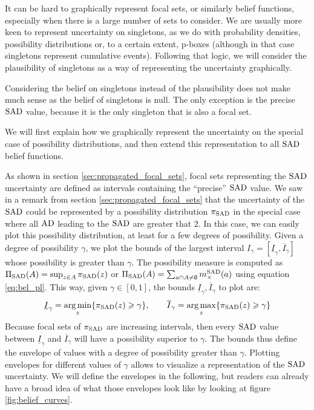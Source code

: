 It can be hard to graphically represent focal sets, or similarly belief functions, especially when there is a large number of sets to consider. We are usually more keen to represent uncertainty on singletons, as we do with probability densities, possibility distributions or, to a certain extent, p-boxes (although in that case singletons represent cumulative events). Following that logic, we will consider the plausibility of singletons as a way of representing the uncertainty graphically.
\begin{remark}
    Considering the belief on singletons instead of the plausibility does not make much sense as the belief of singletons is null. The only exception is the precise ${\mathrm{SAD}}$ value, because it is the only singleton that is also a focal set.
\end{remark}
We will first explain how we  graphically represent the uncertainty on the special case of possibility distributions, and then extend this representation to all ${\mathrm{SAD}}$ belief functions. 

As shown in section \ref{sec:propagated_focal_sets}, focal sets representing the ${\mathrm{SAD}}$ uncertainty are defined as intervals containing the ``precise'' ${\mathrm{SAD}}$ value. We saw in a remark from section \ref{sec:propagated_focal_sets} that the uncertainty of the ${\mathrm{SAD}}$ could be represented by a possibility distribution $\pi_{\mathrm{SAD}}$ in the special case where all ${\mathrm{AD}}$ leading to the ${\mathrm{SAD}}$ are greater that $2$. In this case, we can easily plot this possibility distribution, at least for a few degrees of possibility. Given a degree of possibility $\gamma$, we plot the bounds of the largest interval $I_\gamma=[\underline{I}_\gamma, \overline{I}_\gamma]$ whose possibility is greater than $\gamma$. The possibility measure is computed as $\Pi_{\mathrm{SAD}}(A)=\sup_{z\in A}\pi_{\mathrm{SAD}}(z)$ or $\Pi_{\mathrm{SAD}}(A)=\sum_{a\cap A\neq\emptyset}m^{\mathrm{SAD}}_\times(a)$ using equation \eqref{eq:bel_pl}. This way, given $\gamma\in[0,1]$, the bounds $\underline{I}_\gamma, \overline{I}_\gamma$ to plot are:
\begin{align}\label{eq:possibility_bounds}
    \underline{I}_\gamma = \operatorname*{arg\,min}_{z}\{\pi_{\mathrm{SAD}}(z)\geqslant\gamma\}, \qquad \overline{I}_\gamma = \operatorname*{arg\,max}_{z}\{\pi_{\mathrm{SAD}}(z)\geqslant\gamma\}
\end{align}
Because focal sets of $\pi_{\mathrm{SAD}}$ are increasing intervals, then every ${\mathrm{SAD}}$ value between $\underline{I}_\gamma$ and $\overline{I}_\gamma$ will have a possibility superior to $\gamma$. The bounds thus define the envelope of values with a degree of possibility greater than $\gamma$. Plotting envelopes for different values of $\gamma$ allows to visualize a representation of the ${\mathrm{SAD}}$ uncertainty. We will define the envelopes in the following, but readers can already have a broad idea of what those envelopes look like by looking at figure \ref{fig:belief_curves}. 


